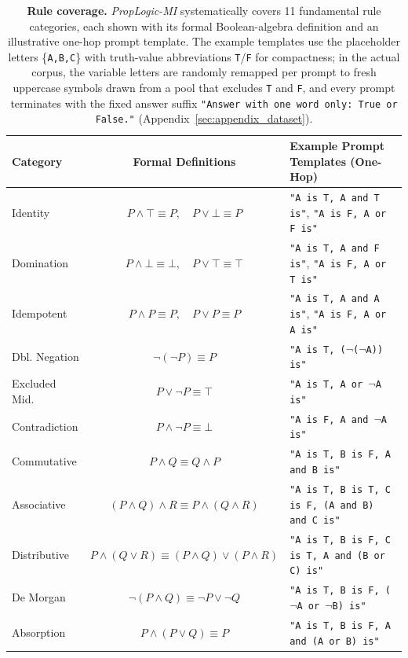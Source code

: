 \documentclass[11pt]{article}
\begin{document}
\begin{table}[t]
\centering
\small
\renewcommand{\arraystretch}{0.9}
\setlength{\tabcolsep}{6pt}
\begin{tabularx}{\textwidth}{@{} l c X @{}}
\toprule
\textbf{Category} & \textbf{Formal Definitions} & \textbf{Example Prompt Templates (One-Hop)} \\
\midrule
Identity
    & $P \land \top \equiv P, \quad P \lor \bot \equiv P$
    & \texttt{"A is T, A and T is"}, \quad \texttt{"A is F, A or F is"} \\
Domination
    & $P \land \bot \equiv \bot, \quad P \lor \top \equiv \top$
    & \texttt{"A is T, A and F is"}, \quad \texttt{"A is F, A or T is"} \\
Idempotent
    & $P \land P \equiv P, \quad P \lor P \equiv P$
    & \texttt{"A is T, A and A is"}, \quad \texttt{"A is F, A or A is"} \\
\midrule
Dbl. Negation
    & $\lnot(\lnot P) \equiv P$
    & \texttt{"A is T, ($\lnot$($\lnot$A)) is"} \\
Excluded Mid.
    & $P \lor \lnot P \equiv \top$
    & \texttt{"A is T, A or $\lnot$A is"} \\
Contradiction
    & $P \land \lnot P \equiv \bot$
    & \texttt{"A is F, A and $\lnot$A is"} \\
\midrule
Commutative
    & $P \land Q \equiv Q \land P$
    & \texttt{"A is T, B is F, A and B is"} \\
Associative
    & $(P \land Q) \land R \equiv P \land (Q \land R)$
    & \texttt{"A is T, B is T, C is F, (A and B) and C is"} \\
Distributive
    & $P \land (Q \lor R) \equiv (P \land Q) \lor (P \land R)$
    & \texttt{"A is T, B is F, C is T, A and (B or C) is"} \\
De Morgan
    & $\lnot(P \land Q) \equiv \lnot P \lor \lnot Q$
    & \texttt{"A is T, B is F, ($\lnot$A or $\lnot$B) is"} \\
Absorption
    & $P \land (P \lor Q) \equiv P$
    & \texttt{"A is T, B is F, A and (A or B) is"} \\
\bottomrule
\end{tabularx}
\caption{\textbf{Rule coverage.} \textit{PropLogic-MI} systematically covers 11 fundamental rule categories, each shown with its formal Boolean-algebra definition and an illustrative one-hop prompt template. The example templates use the placeholder letters \{\texttt{A,B,C}\} with truth-value abbreviations \texttt{T}/\texttt{F} for compactness; in the actual corpus, the variable letters are randomly remapped per prompt to fresh uppercase symbols drawn from a pool that excludes \texttt{T} and \texttt{F}, and every prompt terminates with the fixed answer suffix \texttt{"Answer with one word only: True or False."} (Appendix~\ref{sec:appendix_dataset}).}
\vspace{-1.0em}
\label{tab:rule_coverage}
\end{table}
\end{document}
